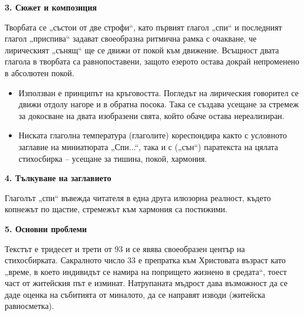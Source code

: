 \documentclass[12pt,a4paper]{article}
\begin{document}
\vspace{0.1cm}
\textbf{3. Сюжет и композиция}
\vspace{0.1cm}

\indent Творбата се „състои от две строфи“, като първият глагол „спи“ и последният глагол „приспива“ задават своеобразна ритмична рамка с очакване, че лирическият „сънящ“ ще се движи от покой към движение. Всъщност двата глагола в творбата са равнопоставени, защото езерото остава докрай непроменено в абсолютен покой.

\vspace{0.1cm}
\begin{itemize}[leftmargin=*, noitemsep, topsep=2pt, parsep=0pt]
    \item Използван е принципът на кръговостта. Погледът на лирическия говорител се движи отдолу нагоре и в обратна посока. Така се създава усещане за стремеж за докосване на двата изобразени свята, който обаче остава нереализиран.
    \vspace{0.1cm}
    \item Ниската глаголна температура (глаголите) кореспондира както с условното заглавие на миниатюрата „Спи...“, така и с („сън“) паратекста на цялата стихосбирка – усещане за тишина, покой, хармония.
\end{itemize}

\vspace{0.1cm}
\textbf{4. Тълкуване на заглавието}
\vspace{0.1cm}

\indent Глаголът „спи“ въвежда читателя в една друга илюзорна реалност, където копнежът по щастие, стремежът към хармония са постижими.

\vspace{0.1cm}
\textbf{5. Основни проблеми}
\vspace{0.1cm}

\indent Текстът е тридесет и трети от 93 и се явява своеобразен център на стихосбирката. Сакралното число 33 е препратка към Христовата възраст като „време, в което индивидът се намира на попрището жизнено в средата“, тоест част от житейския път е изминат. Натрупаната мъдрост дава възможност да се даде оценка на събитията от миналото, да се направят изводи (житейска равносметка).
\end{document}
